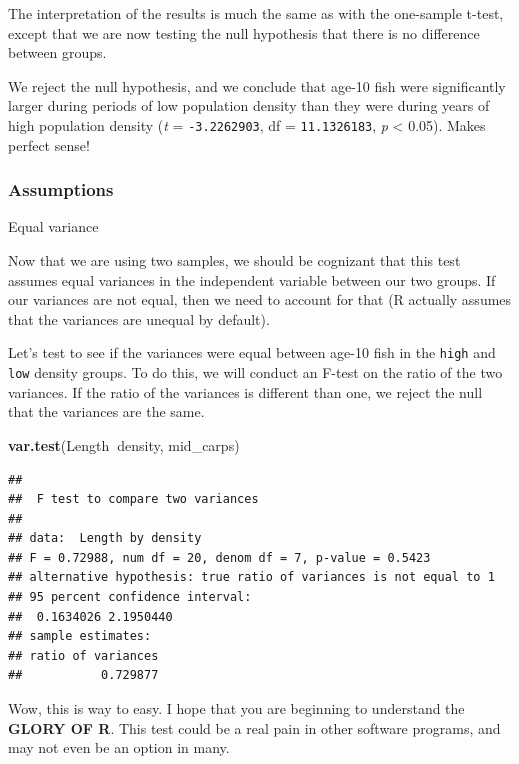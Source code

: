 \documentclass[
]{book}
\newenvironment{Shaded}{\begin{snugshade}}{\end{snugshade}}
\newcommand{\KeywordTok}[1]{\textcolor[rgb]{0.13,0.29,0.53}{\textbf{#1}}}
\newcommand{\NormalTok}[1]{#1}
\newcommand{\OperatorTok}[1]{\textcolor[rgb]{0.81,0.36,0.00}{\textbf{#1}}}
\begin{document}
The interpretation of the results is much the same as with the one-sample t-test, except that we are now testing the null hypothesis that there is no difference between groups.

We reject the null hypothesis, and we conclude that age-10 fish were significantly larger during periods of low population density than they were during years of high population density (\emph{t} = \texttt{-3.2262903}, df = \texttt{11.1326183}, \emph{p} \textless{} 0.05). Makes perfect sense!

\hypertarget{assumptions-1}{%
\subsubsection{Assumptions}\label{assumptions-1}}

Equal variance

Now that we are using two samples, we should be cognizant that this test assumes equal variances in the independent variable between our two groups. If our variances are not equal, then we need to account for that (R actually assumes that the variances are unequal by default).

Let's test to see if the variances were equal between age-10 fish in the \texttt{high} and \texttt{low} density groups. To do this, we will conduct an F-test on the ratio of the two variances. If the ratio of the variances is different than one, we reject the null that the variances are the same.

\begin{Shaded}
\begin{Highlighting}[]
\KeywordTok{var.test}\NormalTok{(Length}\OperatorTok{~}\NormalTok{density, mid_carps)}
\end{Highlighting}
\end{Shaded}

\begin{verbatim}
## 
## 	F test to compare two variances
## 
## data:  Length by density
## F = 0.72988, num df = 20, denom df = 7, p-value = 0.5423
## alternative hypothesis: true ratio of variances is not equal to 1
## 95 percent confidence interval:
##  0.1634026 2.1950440
## sample estimates:
## ratio of variances 
##           0.729877
\end{verbatim}

Wow, this is way to easy. I hope that you are beginning to understand the \textbf{GLORY OF R}. This test could be a real pain in other software programs, and may not even be an option in many.
\end{document}
